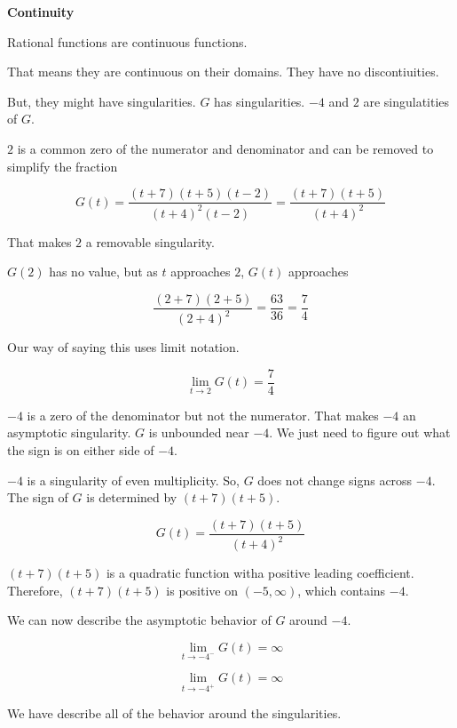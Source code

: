 \documentclass{ximera}
\begin{document}
\textbf{\textcolor{purple!85!blue}{Continuity}} \\

\begin{explanation}

Rational functions are continuous functions.

That means they are continuous on their domains. They have no discontiuities.

But, they might have singularities.  $G$ has singularities. $-4$ and $2$ are singulatities of $G$.


$2$ is a common zero of the numerator and denominator and can be removed to simplify the fraction


\[
G(t) = \frac{(t+7)(t+5)(t-2)}{(t+4)^2(t-2)} = \frac{(t+7)(t+5)}{(t+4)^2}
\]

That makes $2$ a removable singularity.


$G(2)$ has no value, but as $t$ approaches $2$, $G(t)$ approaches 


\[
\frac{(2+7)(2+5)}{(2+4)^2} = \frac{63}{36} = \frac{7}{4}
\]



Our way of saying this uses limit notation.



\[
\lim\limits_{t \to 2} G(t) = \frac{7}{4}
\]




$-4$ is a zero of the denominator but not the numerator.  That makes $-4$ an asymptotic singularity.  $G$ is unbounded near $-4$.  We just need to figure out what the sign is on either side of $-4$.


$-4$ is a singularity of even multiplicity.  So, $G$ does not change signs across $-4$.  The sign of $G$ is determined by $(t+7)(t+5)$.

\[
G(t) = \frac{(t+7)(t+5)}{(t+4)^2}
\]


$(t+7)(t+5)$ is a quadratic function witha positive leading coefficient. Therefore, $(t+7)(t+5)$ is positive on $(-5, \infty)$, which contains $-4$.

We can now describe the asymptotic behavior of $G$ around $-4$.


\[
\lim\limits_{t \to -4^-} G(t) = \infty
\]


\[
\lim\limits_{t \to -4^+} G(t) = \infty
\]

\end{explanation}



We have describe all of the behavior around the singularities. \\
\end{document}
